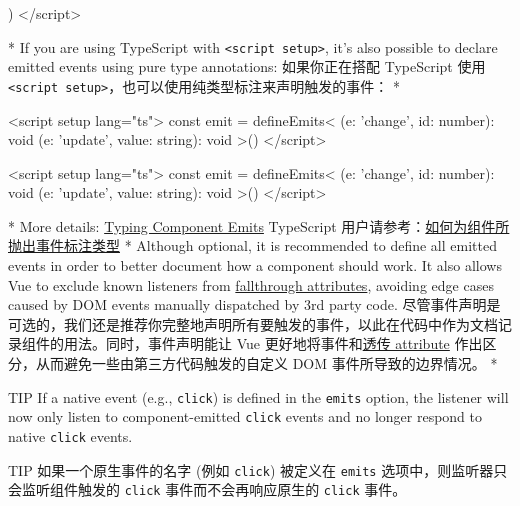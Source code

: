 \begin{paracol}{2}
\begin{codeHtml}
{{  }
})
</script>
\end{codeHtml}
\switchcolumn[0]*%
If you are using TypeScript with
\texttt{\textless{}script\ setup\textgreater{}}, it's also possible to
declare emitted events using pure type annotations:
\switchcolumn
如果你正在搭配 TypeScript 使用
\texttt{\textless{}script\ setup\textgreater{}}，也可以使用纯类型标注来声明触发的事件：
\switchcolumn[0]*%
\begin{codeHtml}
<script setup lang="ts">
const emit = defineEmits<{
  (e: 'change', id: number): void
  (e: 'update', value: string): void
}>()
</script>
\end{codeHtml}
\switchcolumn
\begin{codeHtml}
<script setup lang="ts">
const emit = defineEmits<{
  (e: 'change', id: number): void
  (e: 'update', value: string): void
}>()
</script>
\end{codeHtml}
\switchcolumn[0]*%
More details:
\href{https://vuejs.org/guide/typescript/composition-api.html\#typing-component-emits}{Typing
Component Emits}
\switchcolumn
TypeScript
用户请参考：\href{https://cn.vuejs.org/guide/typescript/composition-api.html\#typing-component-emits}{如何为组件所抛出事件标注类型}
\switchcolumn[0]*%
Although optional, it is recommended to define all emitted events in
order to better document how a component should work. It also allows Vue
to exclude known listeners from
\href{https://vuejs.org/guide/components/attrs.html\#v-on-listener-inheritance}{fallthrough
attributes}, avoiding edge cases caused by DOM events manually
dispatched by 3rd party code.
\switchcolumn
尽管事件声明是可选的，我们还是推荐你完整地声明所有要触发的事件，以此在代码中作为文档记录组件的用法。同时，事件声明能让
Vue
更好地将事件和\href{https://cn.vuejs.org/guide/components/attrs.html\#v-on-listener-inheritance}{透传
attribute} 作出区分，从而避免一些由第三方代码触发的自定义 DOM
事件所导致的边界情况。
\switchcolumn[0]*%
\begin{vueQuote}{TIP}
If a native event (e.g., \texttt{click}) is defined in the
\texttt{emits} option, the listener will now only listen to
component-emitted \texttt{click} events and no longer respond to native
\texttt{click} events.
\end{vueQuote} 
\switchcolumn
\begin{vueQuote}{TIP}
如果一个原生事件的名字 (例如 \texttt{click}) 被定义在 \texttt{emits}
选项中，则监听器只会监听组件触发的 \texttt{click} 事件而不会再响应原生的
\texttt{click} 事件。
\end{vueQuote}  
\end{paracol}



